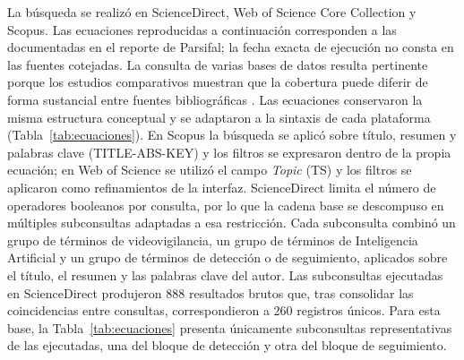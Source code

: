 \documentclass[pdflatex,sn-mathphys-num]{sn-jnl}%
\theoremstyle{thmstyleone}%
\theoremstyle{thmstyletwo}%
\theoremstyle{thmstylethree}%
\begin{document}
La búsqueda se realizó en ScienceDirect, Web of Science Core Collection y Scopus. Las ecuaciones reproducidas a continuación corresponden a las documentadas en el reporte de Parsifal; la fecha exacta de ejecución no consta en las fuentes cotejadas. La consulta de varias bases de datos resulta pertinente porque los estudios comparativos muestran que la cobertura puede diferir de forma sustancial entre fuentes bibliográficas \cite{martin2021}. Las ecuaciones conservaron la misma estructura conceptual y se adaptaron a la sintaxis de cada plataforma (Tabla~\ref{tab:ecuaciones}). En Scopus la búsqueda se aplicó sobre título, resumen y palabras clave (TITLE-ABS-KEY) y los filtros se expresaron dentro de la propia ecuación; en Web of Science se utilizó el campo \textit{Topic} (TS) y los filtros se aplicaron como refinamientos de la interfaz. ScienceDirect limita el número de operadores booleanos por consulta, por lo que la cadena base se descompuso en múltiples subconsultas adaptadas a esa restricción. Cada subconsulta combinó un grupo de términos de videovigilancia, un grupo de términos de Inteligencia Artificial y un grupo de términos de detección o de seguimiento, aplicados sobre el título, el resumen y las palabras clave del autor. Las subconsultas ejecutadas en ScienceDirect produjeron 888 resultados brutos que, tras consolidar las coincidencias entre consultas, correspondieron a 260 registros únicos. Para esta base, la Tabla~\ref{tab:ecuaciones} presenta únicamente subconsultas representativas de las ejecutadas, una del bloque de detección y otra del bloque de seguimiento.
\end{document}
